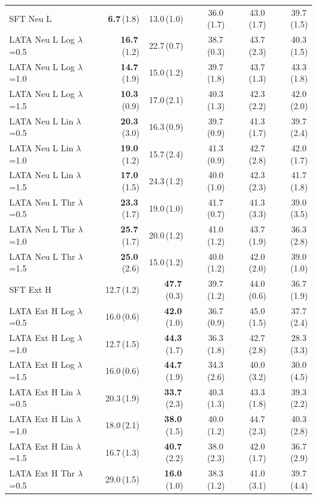 \begin{longtable}{lrrrrr}
SFT Neu L & \textbf{6.7}\,(1.8) & 13.0\,(1.0) & 36.0\,(1.7) & 43.0\,(1.7) & 39.7\,(1.5) \\
LATA Neu L Log $\lambda$=0.5 & \textbf{16.7}\,(1.2) & 22.7\,(0.7) & 38.7\,(0.3) & 43.7\,(2.3) & 40.3\,(1.5) \\
LATA Neu L Log $\lambda$=1.0 & \textbf{14.7}\,(1.9) & 15.0\,(1.2) & 39.7\,(1.8) & 43.7\,(1.3) & 43.3\,(1.8) \\
LATA Neu L Log $\lambda$=1.5 & \textbf{10.3}\,(0.9) & 17.0\,(2.1) & 40.3\,(1.3) & 42.3\,(2.2) & 42.0\,(2.0) \\
LATA Neu L Lin $\lambda$=0.5 & \textbf{20.3}\,(3.0) & 16.3\,(0.9) & 39.7\,(0.9) & 41.3\,(1.7) & 39.7\,(2.4) \\
LATA Neu L Lin $\lambda$=1.0 & \textbf{19.0}\,(1.2) & 15.7\,(2.4) & 41.3\,(0.9) & 42.7\,(2.8) & 42.0\,(1.7) \\
LATA Neu L Lin $\lambda$=1.5 & \textbf{17.0}\,(1.5) & 24.3\,(1.2) & 40.0\,(1.0) & 42.3\,(2.3) & 41.7\,(1.8) \\
LATA Neu L Thr $\lambda$=0.5 & \textbf{23.3}\,(1.7) & 19.0\,(1.0) & 41.7\,(0.7) & 41.3\,(3.3) & 39.0\,(3.5) \\
LATA Neu L Thr $\lambda$=1.0 & \textbf{25.7}\,(1.7) & 20.0\,(1.2) & 41.0\,(1.2) & 43.7\,(1.9) & 36.3\,(2.8) \\
LATA Neu L Thr $\lambda$=1.5 & \textbf{25.0}\,(2.6) & 15.0\,(1.2) & 40.0\,(1.2) & 42.0\,(2.0) & 39.0\,(1.0) \\
SFT Ext H & 12.7\,(1.2) & \textbf{47.7}\,(0.3) & 39.7\,(1.2) & 44.0\,(0.6) & 36.7\,(1.9) \\
LATA Ext H Log $\lambda$=0.5 & 16.0\,(0.6) & \textbf{42.0}\,(1.0) & 36.7\,(0.9) & 45.0\,(1.5) & 37.7\,(2.4) \\
LATA Ext H Log $\lambda$=1.0 & 12.7\,(1.5) & \textbf{44.3}\,(1.7) & 36.3\,(1.8) & 42.7\,(2.8) & 28.3\,(3.3) \\
LATA Ext H Log $\lambda$=1.5 & 16.0\,(0.6) & \textbf{44.7}\,(1.9) & 34.3\,(2.6) & 40.0\,(3.2) & 30.0\,(4.5) \\
LATA Ext H Lin $\lambda$=0.5 & 20.3\,(1.9) & \textbf{33.7}\,(2.3) & 40.3\,(1.3) & 43.3\,(1.8) & 39.3\,(2.2) \\
LATA Ext H Lin $\lambda$=1.0 & 18.0\,(2.1) & \textbf{38.0}\,(1.5) & 40.0\,(1.2) & 44.7\,(2.3) & 40.3\,(2.8) \\
LATA Ext H Lin $\lambda$=1.5 & 16.7\,(1.3) & \textbf{40.7}\,(2.2) & 38.0\,(2.3) & 42.0\,(1.7) & 36.7\,(2.9) \\
LATA Ext H Thr $\lambda$=0.5 & 29.0\,(1.5) & \textbf{16.0}\,(1.0) & 38.3\,(1.2) & 41.0\,(3.1) & 39.7\,(4.4) \\

\end{longtable}
